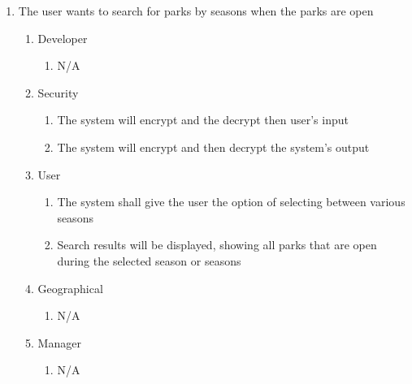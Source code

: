 \documentclass[titlepage]{article}
\begin{document}
\begin{enumerate}[{BE}1.]
    \item The user wants to search for parks by seasons when the parks are open
    \begin{enumerate}[{VP\theenumi}.1]
        \item Developer
            \begin{enumerate}
                \item N/A
            \end{enumerate}
        \item Security
            \begin{enumerate}
                \item The system will encrypt and the decrypt then user's input
                \item The system will encrypt and then decrypt the system's output
            \end{enumerate}
        \item User
            \begin{enumerate}
                \item The system shall give the user the option of selecting between various seasons
                \item Search results will be displayed, showing all parks that are open during
                the selected season or seasons
            \end{enumerate}
        \item Geographical
            \begin{enumerate}
                \item N/A
            \end{enumerate}
        \item Manager
            \begin{enumerate}
                \item N/A
            \end{enumerate}
    \end{enumerate}


\end{enumerate}
\end{document}
